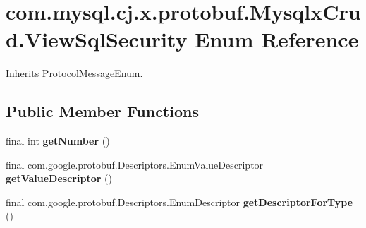\hypertarget{enumcom_1_1mysql_1_1cj_1_1x_1_1protobuf_1_1_mysqlx_crud_1_1_view_sql_security}{}\section{com.\+mysql.\+cj.\+x.\+protobuf.\+Mysqlx\+Crud.\+View\+Sql\+Security Enum Reference}
\label{enumcom_1_1mysql_1_1cj_1_1x_1_1protobuf_1_1_mysqlx_crud_1_1_view_sql_security}


Inherits Protocol\+Message\+Enum.

\subsection*{Public Member Functions}
\begin{DoxyCompactItemize}
\item 
\mbox{\label{enumcom_1_1mysql_1_1cj_1_1x_1_1protobuf_1_1_mysqlx_crud_1_1_view_sql_security_ab2e1b685878553a5d0526e614905f291}} 
final int {\bfseries get\+Number} ()
\item 
\mbox{\label{enumcom_1_1mysql_1_1cj_1_1x_1_1protobuf_1_1_mysqlx_crud_1_1_view_sql_security_a332cfd7d43dd39e0ca639f7edd6818e6}} 
final com.\+google.\+protobuf.\+Descriptors.\+Enum\+Value\+Descriptor {\bfseries get\+Value\+Descriptor} ()
\item 
\mbox{\label{enumcom_1_1mysql_1_1cj_1_1x_1_1protobuf_1_1_mysqlx_crud_1_1_view_sql_security_a6ee7eaff3dc589bb16f9451998f8b810}} 
final com.\+google.\+protobuf.\+Descriptors.\+Enum\+Descriptor {\bfseries get\+Descriptor\+For\+Type} ()
\end{DoxyCompactItemize}
